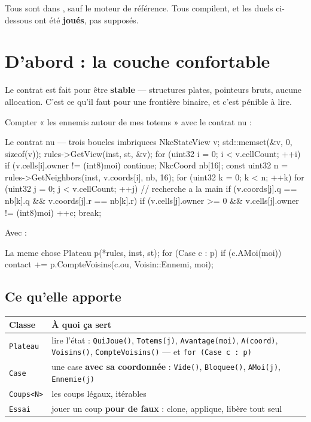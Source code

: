 Tous sont dans , sauf le moteur de référence. Tous compilent,
et les duels ci-dessous ont été \textbf{joués}, pas supposés.

\section{D'abord : la couche confortable}

Le contrat est fait pour être \textbf{stable} — structures plates, pointeurs
bruts, aucune allocation. C'est ce qu'il faut pour une frontière binaire, et
c'est pénible à lire.

Compter « les ennemis autour de mes totems » avec le contrat nu :

\begin{nkcode}{Le contrat nu — trois boucles imbriquees}
NkcStateView v;
std::memset(&v, 0, sizeof(v));
rules->GetView(inst, st, &v);
for (uint32 i = 0; i < v.cellCount; ++i) {
    if (v.cells[i].owner != (int8)moi) continue;
    NkcCoord nb[16];
    const uint32 n = rules->GetNeighbors(inst, v.coords[i], nb, 16);
    for (uint32 k = 0; k < n; ++k)
        for (uint32 j = 0; j < v.cellCount; ++j)   // recherche a la main
            if (v.coords[j].q == nb[k].q && v.coords[j].r == nb[k].r) {
                if (v.cells[j].owner >= 0 &&
                    v.cells[j].owner != (int8)moi) ++c;
                break;
            }
}
\end{nkcode}

Avec  :

\begin{nkcode}{La meme chose}
Plateau p(*rules, inst, st);
for (Case c : p)
    if (c.AMoi(moi))
        contact += p.CompteVoisins(c.ou, Voisin::Ennemi, moi);
\end{nkcode}

\subsection{Ce qu'elle apporte}

\begin{center}
\begin{tabular}{@{}p{2.4cm}p{11.4cm}@{}}
\toprule
\textbf{Classe} & \textbf{À quoi ça sert} \\
\midrule
\texttt{Plateau} & lire l'état : \texttt{QuiJoue()}, \texttt{Totems(j)},
  \texttt{Avantage(moi)}, \texttt{A(coord)}, \texttt{Voisins()},
  \texttt{CompteVoisins()} — et \texttt{for (Case c : p)} \\
\texttt{Case} & une case \textbf{avec sa coordonnée} : \texttt{Vide()},
  \texttt{Bloquee()}, \texttt{AMoi(j)}, \texttt{Ennemie(j)} \\
\texttt{Coups<N>} & les coups légaux, itérables \\
\texttt{Essai} & jouer un coup \textbf{pour de faux} : clone, applique, libère
  tout seul \\
\bottomrule
\end{tabular}
\end{center}

